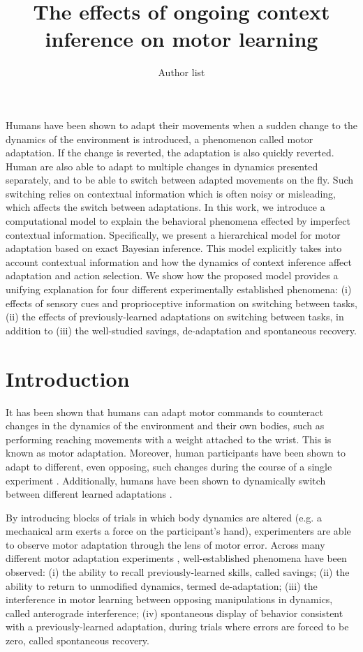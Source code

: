\documentclass[a4paper,doc,floatsintext,natbib]{apa6}%
\title{The effects of ongoing context inference on motor learning}
\author[1]{Author list}
\affil[1]{Affiliation list}
\affiliation{~}
\begin{document}
\maketitle

Humans have been shown to adapt their movements when a sudden change to the dynamics of the environment is introduced, a phenomenon called motor adaptation. If the change is reverted, the adaptation is also quickly reverted. Human are also able to adapt to multiple changes in dynamics presented separately, and to be able to switch between adapted movements on the fly. Such switching relies on contextual information which is often noisy or misleading, which affects the switch between adaptations. In this work, we introduce a computational model to explain the behavioral phenomena effected by imperfect contextual information. Specifically, we present a hierarchical model for motor adaptation based on exact Bayesian inference. This model explicitly takes into account contextual information and how the dynamics of context inference affect adaptation and action selection. We show how the proposed model provides a unifying explanation for four different experimentally established phenomena: (i) effects of sensory cues and proprioceptive information on switching between tasks, (ii) the effects of previously-learned adaptations on switching between tasks, in addition to (iii) the well-studied savings, de-adaptation and spontaneous recovery.


\section{Introduction}
It has been shown that humans can adapt motor commands to counteract changes in the dynamics of the environment and their own bodies, such as performing reaching movements with a weight attached to the wrist. This is known as motor adaptation. Moreover, human participants have been shown to adapt to different, even opposing, such changes during the course of a single experiment \citep{Gandolfo_Motor_1996,Shadmehr_Functional_1997}. Additionally, humans have been shown to dynamically switch between different learned adaptations \citep{Davidson_Scaling_2004,Ethier_Spontaneous_2008,Lee_Dual_2009}.

By introducing blocks of trials in which body dynamics are altered (e.g. a mechanical arm exerts a force on the participant's hand), experimenters are able to observe motor adaptation through the lens of motor error. Across many different motor adaptation experiments \citep[e.g.][]{Gandolfo_Motor_1996,Shadmehr_Adaptive_1994,Davidson_Scaling_2004}, well-established phenomena have been observed: (i) the ability to recall previously-learned skills, called savings; (ii) the ability to return to unmodified dynamics, termed de-adaptation; (iii) the interference in motor learning between opposing manipulations in dynamics, called anterograde interference; (iv) spontaneous display of behavior consistent with a previously-learned adaptation, during trials where errors are forced to be zero, called spontaneous recovery.
\end{document}

